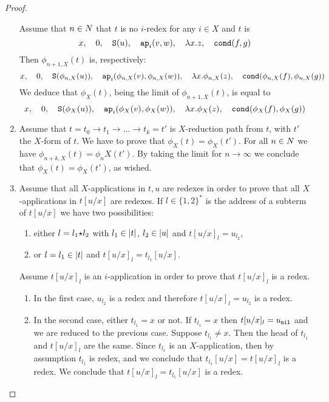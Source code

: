 \begin{proof}
\begin{enumerate}

Assume that $n \in {N}$ that $t$ is no $i$-redex for any $i \in X$ and $t$ is
$$ 
x, \ \ \  
0, \ \ \  
{\tt S}(u),  \ \ \  
{\tt ap}_i(v,w), \ \ \  
\lambda x.z, \ \ \  
{\tt cond}(f,g)
$$
Then $\phi_{n+1,X}(t)$ is, respectively:
$$ 
x, \ \ \  
0, \ \ \  
{\tt S}(\phi_{n,X}(u)),  \ \ \  
{\tt ap}_i(\phi_{n,X}(v),\phi_{n,X}(w)), \ \ \  
\lambda x.\phi_{n,X}(z), \ \ \  
{\tt cond}(\phi_{n,X}(f),\phi_{n,X}(g))
$$
We deduce that $\phi_X(t)$, being the limit of $\phi_{n+1,X}(t)$, is equal to
$$ 
x, \ \ \  
0, \ \ \  
{\tt S}(\phi_X(u)),  \ \ \  
{\tt ap}_i(\phi_X(v),\phi_X(w)), \ \ \  
\lambda x.\phi_X(z), \ \ \  
{\tt cond}(\phi_X(f),\phi_X(g))
$$
 

\item
Assume that $t=t_0 \rightarrow t_1 \rightarrow \ldots \rightarrow t_k = t'$ 
is  $X$-reduction path from $t$, with $t'$ the $X$-form of $t$. 
We have to prove that $\phi_X(t) = \phi_X(t')$.
For all $n \in {N}$ we have $\phi_{n+k,X}(t) = \phi_{n}X(t')$.
By taking the limit for $n \rightarrow \infty$ we conclude that $\phi_X(t) = \phi_X(t')$,
as wished.

\item
Assume that all $X$-applications in $t,u$ are redexes in order to prove that 
all $X$-applications in $t[u/x]$ are redexes.
If $l \in \{1,2\}^*$ is the address of a subterm of $t[u/x]$ we have two possibilities:

\begin{enumerate}
\item
either $l = l_1 {\star} l_2$ with $ l_1 \in {|t|}$, $ l_2 \in {|u|}$ and $t[u/x]_l = u_{l_2}$,
\item
or $l = l_1 \in {|t|}$ and $t[u/x]_l = t_{l_1}[u/x]$.
\end{enumerate}
Assume $t[u/x]_l$ is an $i$-application in order to prove that $t[u/x]_l$ is a redex.

\begin{enumerate}
\item
In the first case, $u_{l_2}$ is a redex and therefore $t[u/x]_l = u_{l_2}$ is a redex.
\item
In the second case, either $t_{l_1}=x$ or not. 
If   $t_{l_1}=x$ then $t[u/x]_l = u_{{\tt nil}}$ and we are reduced to the previous case.
Suppose  $t_{l_1}\not =x$. Then the head of $t_{l_1}$ and $t[u/x]_l$ are the same.
Since $t_{l_1}$ is an $X$-application, then by assumption $t_{l_1}$ is redex, and we
conclude that $t_{l_1}[u/x] = t[u/x]_l $ is a redex.
We conclude that $t[u/x]_l = t_{l_1}[u/x]$ is a redex.
\end{enumerate}


\end{enumerate}
\end{proof}
